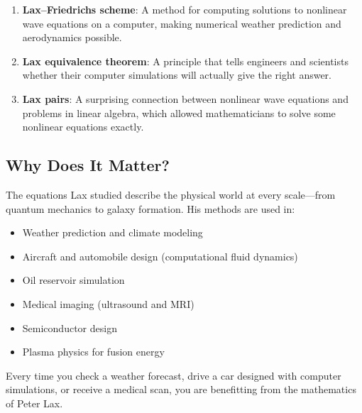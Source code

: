 \begin{enumerate}
\item \textbf{Lax--Friedrichs scheme}: A method for computing solutions to nonlinear wave equations on a computer, making numerical weather prediction and aerodynamics possible.

\item \textbf{Lax equivalence theorem}: A principle that tells engineers and scientists whether their computer simulations will actually give the right answer.

\item \textbf{Lax pairs}: A surprising connection between nonlinear wave equations and problems in linear algebra, which allowed mathematicians to solve some nonlinear equations exactly.
\end{enumerate}

\subsection{Why Does It Matter?}

The equations Lax studied describe the physical world at every scale---from quantum mechanics to galaxy formation. His methods are used in:

\begin{itemize}
\item Weather prediction and climate modeling
\item Aircraft and automobile design (computational fluid dynamics)
\item Oil reservoir simulation
\item Medical imaging (ultrasound and MRI)
\item Semiconductor design
\item Plasma physics for fusion energy
\end{itemize}

Every time you check a weather forecast, drive a car designed with computer simulations, or receive a medical scan, you are benefitting from the mathematics of Peter Lax.


\begin{center}
\end{center}

